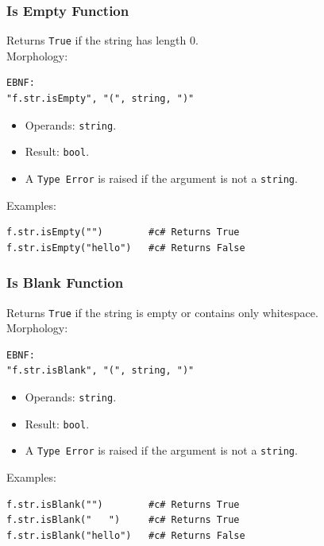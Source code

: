\subsubsection{Is Empty Function}
Returns \texttt{True} if the string has length 0. \\
Morphology:
\begin{verbatim}
EBNF:
"f.str.isEmpty", "(", string, ")"
\end{verbatim}
\begin{itemize}
\item Operands: \texttt{string}.
\item Result: \texttt{bool}.
\item A \texttt{Type Error} is raised if the argument is not a \texttt{string}.
\end{itemize}
Examples:
\begin{verbatim}
f.str.isEmpty("")        #c# Returns True
f.str.isEmpty("hello")   #c# Returns False
\end{verbatim}

\subsubsection{Is Blank Function}
Returns \texttt{True} if the string is empty or contains only whitespace. \\
Morphology:
\begin{verbatim}
EBNF:
"f.str.isBlank", "(", string, ")"
\end{verbatim}
\begin{itemize}
\item Operands: \texttt{string}.
\item Result: \texttt{bool}.
\item A \texttt{Type Error} is raised if the argument is not a \texttt{string}.
\end{itemize}
Examples:
\begin{verbatim}
f.str.isBlank("")        #c# Returns True
f.str.isBlank("   ")     #c# Returns True
f.str.isBlank("hello")   #c# Returns False
\end{verbatim}

